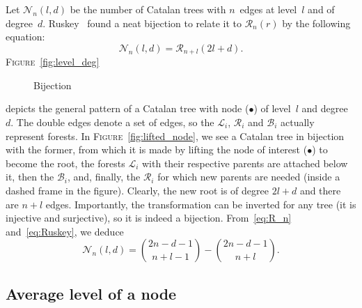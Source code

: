 \documentclass[11pt]{article}
\newcommand\fig{\textsc{Figure}}
\newcommand\Fig{\textsc{Figure}}
\begin{document}
Let \(\mathcal{N}_n(l,d)\) be the number of Catalan trees with
\(n\)~edges at level~\(l\) and of
degree~\(d\). Ruskey~\cite{Ruskey:1983} found a neat bijection to
relate it to \(\mathcal{R}_n(r)\) by the following equation:
\begin{equation}
\mathcal{N}_n(l,d) = \mathcal{R}_{n+l}(2l+d).
\label{eq:Ruskey}
\end{equation}
\Fig~\ref{fig:level_deg}
\begin{figure}
\centering
{}
\quad
{}
\caption{Bijection\label{fig:bij_root_level}}
\end{figure}
depicts the general pattern of a Catalan tree with node (\(\bullet\))
of level~\(l\) and degree~\(d\). The double edges denote a set of
edges, so the \(\mathcal{L}_i\), \(\mathcal{R}_i\) and
\(\mathcal{B}_i\) actually represent forests. In
\fig~\ref{fig:lifted_node}, we see a Catalan tree in bijection with the
former, from which it is made by lifting the node of interest
(\(\bullet\)) to become the root, the forests \(\mathcal{L}_i\) with
their respective parents are attached below it, then the
\(\mathcal{B}_i\), and, finally, the \(\mathcal{R}_i\) for which new
parents are needed (inside a dashed frame in the figure). Clearly, the
new root is of degree \(2l+d\) and there are \(n+l\)
edges. Importantly, the transformation can be inverted for any tree
(it is injective and surjective), so it is indeed a
bijection. From~\eqref{eq:R_n} and~\eqref{eq:Ruskey}, we deduce
\begin{equation}
\mathcal{N}_n(l,d) %
= \binom{2n-d-1}{n+l-1} - \binom{2n-d-1}{n+l}.
\label{eq:N_n_l_d}
\end{equation}

\subsection{Average level of a node}
\end{document}
